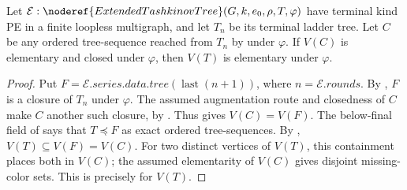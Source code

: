 \begin{lemma}
Let \(\mathcal E:\noderef{ExtendedTashkinovTree}(G,k,e_0,\rho,T,\varphi)\)
have terminal kind PE in a finite loopless multigraph, and let \(T_n\) be
its terminal ladder tree. Let \(C\) be any ordered tree-sequence reached
from \(T_n\) by  under \(\varphi\).
If \(V(C)\) is elementary and closed under \(\varphi\), then \(V(T)\)
is elementary under \(\varphi\).
\end{lemma}
\begin{proof}
Put \(F=\mathcal E.\mathit{series.data.tree}(\operatorname{last}(n+1))\),
where \(n=\mathcal E.\mathit{rounds}\).
By , \(F\) is a closure of \(T_n\)
under \(\varphi\). The assumed augmentation route and closedness of \(C\)
make \(C\) another such closure, by .
Thus  gives \(V(C)=V(F)\).
The below-final field of  says that
\(T\preccurlyeq F\) as exact ordered tree-sequences.
By ,
\(V(T)\subseteq V(F)=V(C)\). For two distinct vertices of \(V(T)\),
this containment places both in \(V(C)\); the assumed elementarity of
\(V(C)\) gives disjoint missing-color sets. This is precisely
 for \(V(T)\).
\end{proof}
